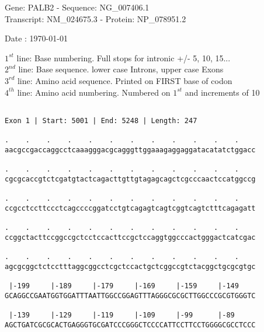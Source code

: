 \documentclass{article}
\begin{document}
\begin{center}
\begin{large}
Gene: PALB2 - Sequence: NG\_007406.1\\
Transcript: NM\_024675.3 - Protein: NP\_078951.2
 
 Date : \today
\end{large}
\end{center}
$1^{st}$ line: Base numbering. Full stops for intronic +/- 5, 10, 15...\\
$2^{nd}$ line: Base sequence. lower case Introns, upper case Exons\\
$3^{rd}$ line: Amino acid sequence. Printed on FIRST base of codon\\
$4^{th}$ line: Amino acid numbering. Numbered on $1^{st}$ and increments of 10\\
 \begin{Verbatim}
 
Exon 1 | Start: 5001 | End: 5248 | Length: 247
 
.    .    .    .    .    .    .    .    .    .    .    .    
aacgccgaccaggcctcaaagggacgcagggttggaaagaggaggatacatatctggacc
                                                            
.    .    .    .    .    .    .    .    .    .    .    .    
cgcgcaccgtctcgatgtactcagacttgttgtagagcagctcgcccaactccatggccg
                                                            
.    .    .    .    .    .    .    .    .    .    .    .    
ccgcctccttccctcagccccggatcctgtcagagtcagtcggtcagtctttcagagatt
                                                            
.    .    .    .    .    .    .    .    .    .    .    .    
ccggctacttccggccgctcctccacttccgctccaggtggcccactgggactcatcgac
                                                            
.    .    .    .    .    .    .    .    .    .    .    .    
agcgcggctctcctttaggcggcctcgctccactgctcggccgtctacggctgcgcgtgc
                                                            
 |-199     |-189     |-179     |-169     |-159     |-149    
GCAGGCCGAATGGTGGATTTAATTGGCCGGAGTTTAGGGCGCGCTTGGCCCGCGTGGGTC
                                                            
 |-139     |-129     |-119     |-109     |-99      |-89     
AGCTGATCGCGCACTGAGGGTGCGATCCCGGGCTCCCCATTCCTTCCTGGGGCGCCTCCC
                                                            

\end{Verbatim}
\end{document}
